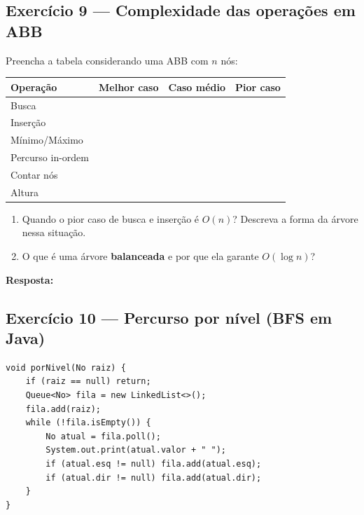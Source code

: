 \documentclass[12pt, a4paper]{article}
\newenvironment{resposta}{%
    \begin{mdframed}[linecolor=black!30, backgroundcolor=white,
                     innertopmargin=10pt, innerbottommargin=30pt,
                     skipabove=6pt]
    \textbf{Resposta:}\\[4pt]
}{%
    \end{mdframed}
}
\begin{document}
\subsection*{Exercício 9 — Complexidade das operações em ABB}

Preencha a tabela considerando uma ABB com $n$ nós:

\bigskip
\begin{center}
\renewcommand{\arraystretch}{2.2}
\begin{tabular}{|l|c|c|c|}
\hline
\textbf{Operação} & \textbf{Melhor caso} & \textbf{Caso médio} & \textbf{Pior caso} \\
\hline
Busca        & & & \\
\hline
Inserção     & & & \\
\hline
Mínimo/Máximo & & & \\
\hline
Percurso in-ordem & & & \\
\hline
Contar nós   & & & \\
\hline
Altura       & & & \\
\hline
\end{tabular}
\end{center}

\bigskip
\begin{enumerate}[label=(\alph*)]
    \item Quando o pior caso de busca e inserção é $O(n)$? Descreva a forma da árvore nessa situação.
    \item O que é uma árvore \textbf{balanceada} e por que ela garante $O(\log n)$?
\end{enumerate}

\begin{resposta}
\vspace{3cm}
\end{resposta}

\subsection*{Exercício 10 — Percurso por nível (BFS em Java)}

\begin{lstlisting}[style=javastyle]
void porNivel(No raiz) {
    if (raiz == null) return;
    Queue<No> fila = new LinkedList<>();
    fila.add(raiz);
    while (!fila.isEmpty()) {
        No atual = fila.poll();
        System.out.print(atual.valor + " ");
        if (atual.esq != null) fila.add(atual.esq);
        if (atual.dir != null) fila.add(atual.dir);
    }
}
\end{lstlisting}
\end{document}
